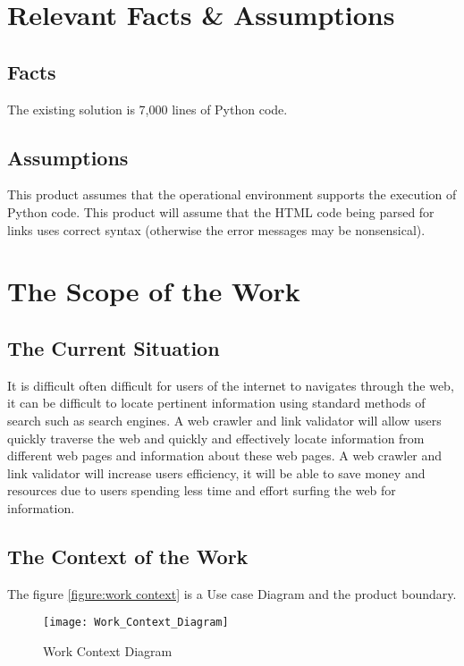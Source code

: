 \documentclass[titlepage]{article}
\begin{document}
\section{Relevant Facts \& Assumptions}

\subsection*{Facts}
The existing solution is 7,000 lines of Python code.

\subsection*{Assumptions}
This product assumes that the operational environment supports the execution of Python code.
This product will assume that the HTML code being parsed for links uses correct syntax (otherwise the error messages may be nonsensical).

\section{The Scope of the Work }

\subsection*{The Current Situation}

It is difficult often difficult for users of the internet to navigates through the web, it can be difficult to locate pertinent information using standard methods of search such as search engines. A web crawler and link validator will allow users quickly traverse the web and quickly and effectively locate information from different web pages and information about these web pages. A web crawler and link validator will increase users efficiency, it will be able to save money and resources due to users spending less time and effort surfing the web for information.\newline

\subsection*{The Context of the Work }
The figure \ref{figure:work context} is a Use case Diagram and the product boundary.
\begin{figure}[h!]
  \caption{Work Context Diagram}
  \centering
    \texttt{[image: Work\_Context\_Diagram]}
\end{figure}
\label{figure:work context}
\end{document}
